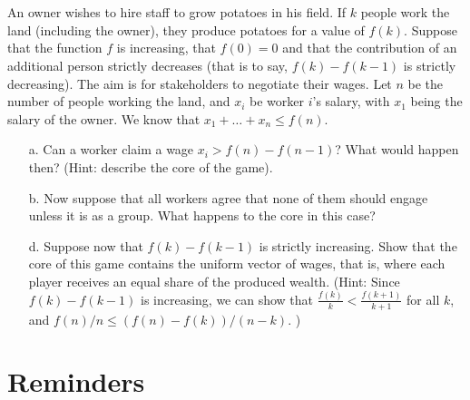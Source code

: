 \documentclass{../ape}
\begin{document}
\begin{solution}

\end{solution}

\section{} An owner wishes to hire staff to grow potatoes in his field. If $k$ people work the land (including the owner), they produce potatoes for a value of $f(k)$. Suppose that the function $f$ is increasing, that $f(0) = 0$ and that the contribution of an additional person strictly decreases (that is to say, $f(k) - f(k-1)$ is strictly decreasing). The aim is for stakeholders to negotiate their wages. Let $n$ be the number of people working the land, and $x_i$ be worker $i$'s salary, with $x_1$ being the salary of the owner. We know that $x_1 + \dots + x_n \leq f(n)$.
\begin{enumerate}
	\item[a.] Can a worker claim a wage $x_i > f(n) - f(n-1)$? What would happen then? (Hint: describe the core of the game).
	\item[b.] Now suppose that all workers agree that none of them should engage unless it is as a group. What happens to the core in this case?
	\item[d.] Suppose now that $f(k) - f(k-1)$ is strictly increasing. Show that the core of this game contains the uniform vector of wages, that is, where each player receives an equal share of the produced wealth. (Hint: Since $f(k) - f(k-1)$ is increasing, we can show that  $\frac{f(k)}{k} < \frac{f(k + 1)}{k + 1} $ for all $k$, and $f(n)/n \leq (f(n) - f(k))/(n-k)$. )
\end{enumerate}
	


\section*{Reminders}
\end{document}
